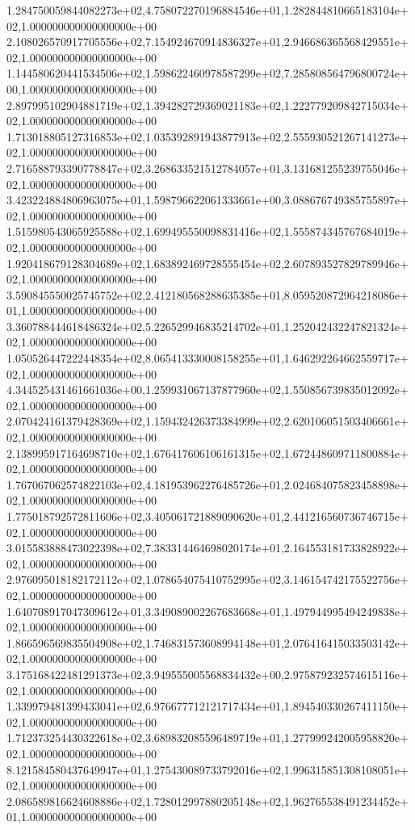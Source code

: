 1.284750059844082273e+02,4.758072270196884546e+01,1.282844810665183104e+02,1.000000000000000000e+00
2.108026570917705556e+02,7.154924670914836327e+01,2.946686365568429551e+02,1.000000000000000000e+00
1.144580620441534506e+02,1.598622460978587299e+02,7.285808564796800724e+00,1.000000000000000000e+00
2.897995102904881719e+02,1.394282729369021183e+02,1.222779209842715034e+02,1.000000000000000000e+00
1.713018805127316853e+02,1.035392891943877913e+02,2.555930521267141273e+02,1.000000000000000000e+00
2.716588793390778847e+02,3.268633521512784057e+01,3.131681255239755046e+02,1.000000000000000000e+00
3.423224884806963075e+01,1.598796622061333661e+00,3.088676749385755897e+02,1.000000000000000000e+00
1.515980543065925588e+02,1.699495550098831416e+02,1.555874345767684019e+02,1.000000000000000000e+00
1.920418679128304689e+02,1.683892469728555454e+02,2.607893527829789946e+02,1.000000000000000000e+00
3.590845550025745752e+02,2.412180568288635385e+01,8.059520872964218086e+01,1.000000000000000000e+00
3.360788444618486324e+02,5.226529946835214702e+01,1.252042432247821324e+02,1.000000000000000000e+00
1.050526447222448354e+02,8.065413330008158255e+01,1.646292264662559717e+02,1.000000000000000000e+00
4.344525431461661036e+00,1.259931067137877960e+02,1.550856739835012092e+02,1.000000000000000000e+00
2.070424161379428369e+02,1.159432426373384999e+02,2.620106051503406661e+02,1.000000000000000000e+00
2.138995917164698710e+02,1.676417606106161315e+02,1.672448609711800884e+02,1.000000000000000000e+00
1.767067062574822103e+02,4.181953962276485726e+01,2.024684075823458898e+02,1.000000000000000000e+00
1.775018792572811606e+02,3.405061721889090620e+01,2.441216560736746715e+02,1.000000000000000000e+00
3.015583888473022398e+02,7.383314464698020174e+01,2.164553181733828922e+02,1.000000000000000000e+00
2.976095018182172112e+02,1.078654075410752995e+02,3.146154742175522756e+02,1.000000000000000000e+00
1.640708917047309612e+01,3.349089002267683668e+01,1.497944995494249838e+02,1.000000000000000000e+00
1.866596569835504908e+02,1.746831573608994148e+01,2.076416415033503142e+02,1.000000000000000000e+00
3.175168422481291373e+02,3.949555005568834432e+00,2.975879232574615116e+02,1.000000000000000000e+00
1.339979481399433041e+02,6.976677712121717434e+01,1.894540330267411150e+02,1.000000000000000000e+00
1.712373254430322618e+02,3.689832085596489719e+01,1.277999242005958820e+02,1.000000000000000000e+00
8.121584580437649947e+01,1.275430089733792016e+02,1.996315851308108051e+02,1.000000000000000000e+00
2.086589816624608886e+02,1.728012997880205148e+02,1.962765538491234452e+01,1.000000000000000000e+00
